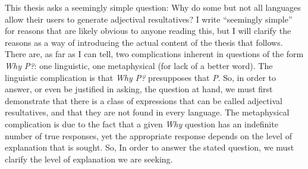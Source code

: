 \documentclass[MilwayThesis]{subfiles}
\begin{document}
This thesis asks a seemingly simple question: Why do some but not all languages allow their users to generate adjectival resultatives?
I write ``seemingly simple'' for reasons that are likely obvious to anyone reading this, but I will clarify the reasons as a way of introducing the actual content of the thesis that follows.
There are, as far as I can tell, two complications inherent in questions of the form \textit{Why P?}: one linguistic, one metaphysical (for lack of a better word).
The linguistic complication is that \textit{Why P?} presupposes that \textit{P}.
So, in order to answer, or even be justified in asking, the question at hand, we must first demonstrate that there is a class of expressions that can be called adjectival resultatives, and that they are not found in every language.
The metaphysical complication is due to the fact that a given \textit{Why} question has an indefinite number of true responses, yet the appropriate response depends on the level of explanation that is sought.
So, In order to answer the stated question, we must clarify the level of explanation we are seeking.
\end{document}
